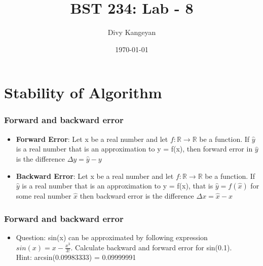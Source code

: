 \documentclass{beamer}
\title[BST 234]{BST 234: Lab - 8}
\author[Divy Kangeyan]{Divy Kangeyan}
\date{\today}
\begin{document}
	
	\begin{frame}
		\titlepage
	\end{frame}
	
	
\section{Stability of Algorithm}




\begin{frame}
\frametitle{Forward and backward error}

\begin{itemize}
\item \textbf{Forward Error}: Let x be a real number and let $f: \mathbb{R} \rightarrow \mathbb{R}$ be a function. If $\hat{y}$ is a real number that is an approximation to y = f(x), then forward error in $\hat{y}$ is the difference $\Delta y = \hat{y} - y$ 
\item \textbf{Backward Error}: Let x be a real number and let $f: \mathbb{R} \rightarrow \mathbb{R}$ be a function. If $\hat{y}$ is a real number that is an approximation to y = f(x), that is $\hat{y} = f(\hat{x})$ for some real number $\hat{x}$ then backward error is the difference $\Delta x = \hat{x} - x$ 
\end{itemize}

\end{frame}


\begin{frame}
\frametitle{Forward and backward error}

\begin{itemize}

\item Question: sin(x) can be approximated by following expression $sin(x) = x - \frac{x^3}{3!}$. Calculate backward and forward error for sin(0.1). \\Hint: arcsin(0.09983333) = 0.09999991
\end{itemize}

\end{frame}
\end{document}
